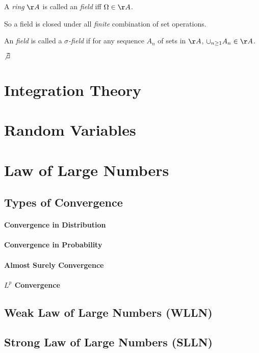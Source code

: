 \documentclass{memoir}
\begin{document}
\begin{deff}
	A {\em{ring}} $\AA$ is called an {\em{field}} iff $\Omega \in \AA$.
\end{deff}
So a field is closed under all {\em{finite}} combination of set operations.


\begin{deff}
	An {\em{field}} is called a {\em{$\sigma$-field}} if for any sequence ${A_n}$ of sets in $\AA$, $\cup_{n \ge 1} A_n \in \AA$.
\end{deff}

$\not \exists$

\chapter{Integration Theory}
\chapter{Random Variables}
\chapter{Law of Large Numbers}
\section{Types of Convergence}
\subsubsection{Convergence in Distribution}
\subsubsection{Convergence in Probability}
\subsubsection{Almost Surely Convergence}
\subsubsection{$L^p$ Convergence}

\section{Weak Law of Large Numbers (WLLN)}
\section{Strong Law of Large Numbers (SLLN)}
\end{document}

